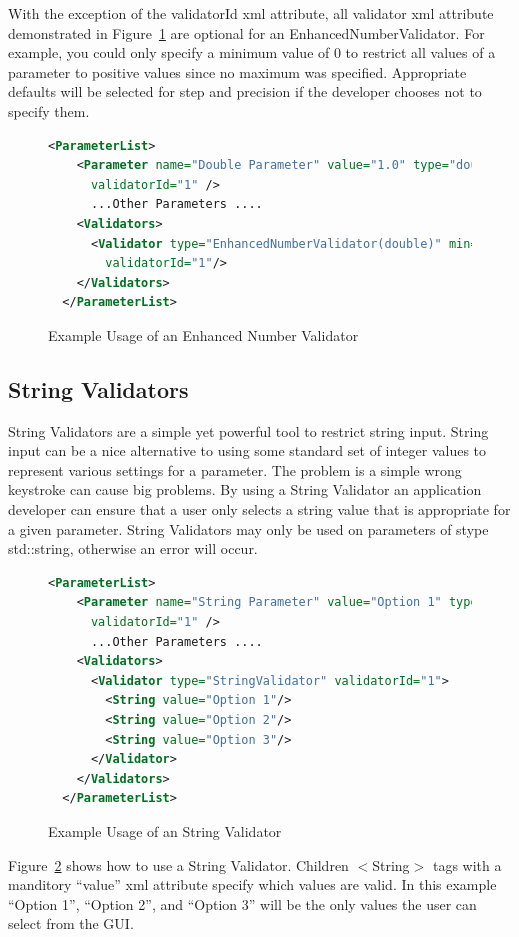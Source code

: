 With the exception of the validatorId xml attribute, all validator xml attribute demonstrated in Figure~\ref{EnhancedNumberValidatorXML}
are optional for an EnhancedNumberValidator. For example, you could only specify a minimum value of 0 to restrict all 
values of a parameter to positive values since no maximum was specified.
Appropriate defaults will be selected for step and precision if the developer chooses not to specify them.
\begin{figure}
  \centering
  \begin{lstlisting}[language=XML]
  <ParameterList>
    <Parameter name="Double Parameter" value="1.0" type="double" docString="A double parameter"
      validatorId="1" />
      ...Other Parameters ....
    <Validators>
      <Validator type="EnhancedNumberValidator(double)" min="0" max="10" step=".5" precision="2"
        validatorId="1"/>
    </Validators>
  </ParameterList>
  \end{lstlisting}
  \caption{Example Usage of an Enhanced Number Validator}
  \label{EnhancedNumberValidatorXML}
\end{figure}

\subsection{String Validators}
String Validators are a simple yet powerful tool to restrict string input. String input can be a nice alternative to
using some standard set of integer values to represent various settings for a parameter. The problem is a simple wrong 
keystroke can cause big problems. By using a String Validator an application developer can ensure that a user 
only selects a string value that is appropriate for a given parameter. 
String Validators may only be used on parameters of stype std::string, otherwise an error will occur.
\begin{figure}
  \centering
  \begin{lstlisting}[language=XML]
  <ParameterList>
    <Parameter name="String Parameter" value="Option 1" type="string" docString="A string parameter"
      validatorId="1" />
      ...Other Parameters ....
    <Validators>
      <Validator type="StringValidator" validatorId="1">
        <String value="Option 1"/> 
        <String value="Option 2"/> 
        <String value="Option 3"/> 
      </Validator>
    </Validators>
  </ParameterList>
  \end{lstlisting}
  \caption{Example Usage of an String Validator}
  \label{StringValidatorXML}
\end{figure}
Figure~\ref{StringValidatorXML} shows how to use a String Validator. Children $<$String$>$ tags with a manditory ``value'' xml attribute specify which values are valid.
In this example ``Option 1'', ``Option 2'', and ``Option 3'' will be the only values the user can select from the GUI.

